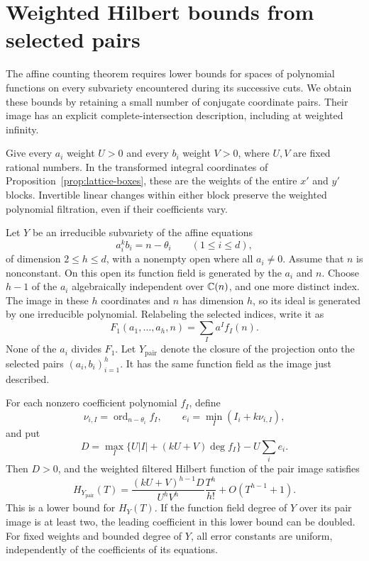 \section{Weighted Hilbert bounds from selected pairs}
\label{sec:hilbert-bounds}

The affine counting theorem requires lower bounds for spaces of
polynomial functions on every subvariety encountered during its
successive cuts.  We obtain these bounds by retaining a small number
of conjugate coordinate pairs.  Their image has an explicit
complete-intersection description, including at weighted infinity.

Give every \(a_i\) weight \(U>0\) and every \(b_i\) weight \(V>0\),
where \(U,V\) are fixed rational numbers.  In the transformed integral
coordinates of Proposition~\ref{prop:lattice-boxes}, these are the
weights of the entire \(x'\) and \(y'\) blocks.  Invertible linear
changes within either block preserve the weighted polynomial
filtration, even if their coefficients vary.

Let \(Y\) be an irreducible subvariety of the affine equations
\[
 a_i^kb_i=n-\theta_i\qquad(1\leq i\leq d),
\]
of dimension \(2\leq h\leq d\), with a nonempty open where all \(a_i\ne0\).
Assume that \(n\) is nonconstant.  On this open its function field
is generated by the \(a_i\) and \(n\).  Choose \(h-1\) of the
\(a_i\) algebraically independent over \(\mathbb C(n)\), and one more
distinct index.  The image in these \(h\) coordinates and \(n\)
has dimension \(h\), so its ideal is generated by one irreducible
polynomial.  Relabeling the selected indices, write it as
\[
 F_1(a_1,\ldots,a_h,n)=\sum_I a^If_I(n).
\]
None of the \(a_i\) divides \(F_1\).  Let \(Y_{\mathrm{pair}}\)
denote the closure of the projection onto the selected pairs
\((a_i,b_i)_{i=1}^h\).  It has the same function field as the
image just described.

\begin{proposition}\label{prop:weighted-hilbert}
For each nonzero coefficient polynomial \(f_I\), define
\[
 \nu_{i,I}=\operatorname{ord}_{n-\theta_i}f_I,\qquad
 e_i=\min_I(I_i+k\nu_{i,I}),
\]
and put
\begin{equation}
 D=\max_I\{U|I|+(kU+V)\deg f_I\}-U\sum_i e_i.
 \label{eq:extracted-weight}
\end{equation}
Then \(D>0\), and the weighted filtered Hilbert function of the
pair image satisfies
\begin{equation}
 H_{Y_{\mathrm{pair}}}(T)=
 \frac{(kU+V)^{h-1}D}{U^hV^h}\frac{T^h}{h!}
 +O(T^{h-1}+1).
 \label{eq:pair-hilbert}
\end{equation}
This is a lower bound for \(H_Y(T)\).
If the function field degree of \(Y\) over its pair image is at least
two, the leading coefficient in this lower bound can be doubled.
For fixed weights and bounded degree of \(Y\), all error constants
are uniform, independently of the coefficients of its equations.
\end{proposition}


